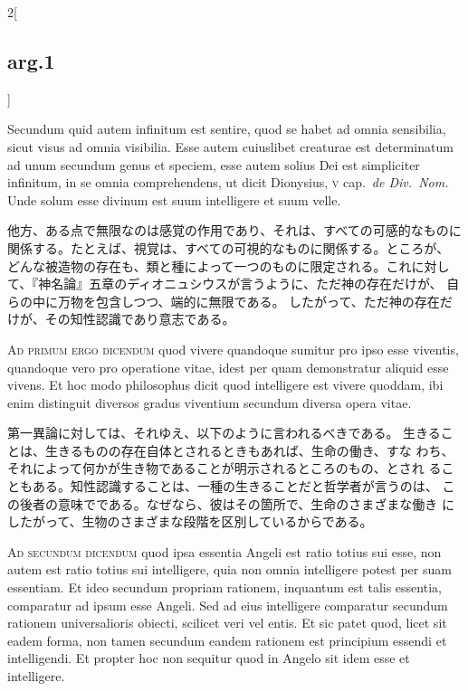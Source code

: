 \documentclass[paper=a4paper,fontsize=10pt,jafontsize=9pt,titlepage]{jlreq}
\begin{document}
\begin{paracol}{2}[\subsection{arg.1}]
\switchcolumn*

Secundum quid autem infinitum est sentire,
quod se habet ad omnia sensibilia, sicut visus ad omnia visibilia. Esse
autem cuiuslibet creaturae est determinatum ad unum secundum genus et
speciem, esse autem solius Dei est simpliciter infinitum, in se omnia
comprehendens, ut dicit Dionysius, {\scshape v} cap.~{\itshape de Div.~Nom.} Unde solum esse
divinum est suum intelligere et suum velle.

\switchcolumn

他方、ある点で無限なのは感覚の作用であり、それは、すべての可感的なものに
 関係する。たとえば、視覚は、すべての可視的なものに関係する。ところが、
 どんな被造物の存在も、類と種によって一つのものに限定される。これに対し
 て、『神名論』五章のディオニュシウスが言うように、ただ神の存在だけが、
 自らの中に万物を包含しつつ、端的に無限である。
したがって、ただ神の存在だけが、その知性認識であり意志である。

\switchcolumn*[\subsection{ad.1}]

{\scshape Ad primum ergo dicendum} quod vivere quandoque
sumitur pro ipso esse viventis, quandoque vero pro operatione vitae,
idest per quam demonstratur aliquid esse vivens. Et hoc modo philosophus
dicit quod intelligere est vivere quoddam, ibi enim distinguit diversos
gradus viventium secundum diversa opera vitae.

\switchcolumn

第一異論に対しては、それゆえ、以下のように言われるべきである。
生きることは、生きるものの存在自体とされるときもあれば、生命の働き、すな
 わち、それによって何かが生き物であることが明示されるところのもの、とされ
 ることもある。知性認識することは、一種の生きることだと哲学者が言うのは、
 この後者の意味でである。なぜなら、彼はその箇所で、生命のさまざまな働き
 にしたがって、生物のさまざまな段階を区別しているからである。

\switchcolumn*[\subsection{ad.2}]

{\scshape Ad secundum dicendum} quod ipsa essentia
Angeli est ratio totius sui esse, non autem est ratio totius sui
intelligere, quia non omnia intelligere potest per suam essentiam. Et
ideo secundum propriam rationem, inquantum est talis essentia,
comparatur ad ipsum esse Angeli. Sed ad eius intelligere comparatur
secundum rationem universalioris obiecti, scilicet veri vel entis. Et
sic patet quod, licet sit eadem forma, non tamen secundum eandem
rationem est principium essendi et intelligendi. Et propter hoc non
sequitur quod in Angelo sit idem esse et intelligere.


\end{paracol}
\end{document}
